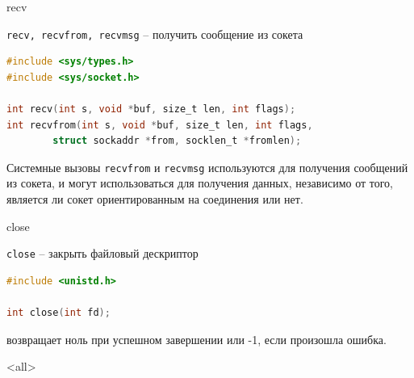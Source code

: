 \begin{frame}[fragile]{recv}

{\tt recv,  recvfrom,  recvmsg} -- получить сообщение из сокета
\begin{lstlisting}[language=C]
#include <sys/types.h>
#include <sys/socket.h>

int recv(int s, void *buf, size_t len, int flags);
int recvfrom(int s, void *buf, size_t len, int flags,
		struct sockaddr *from, socklen_t *fromlen);
\end{lstlisting}
Системные вызовы {\tt recvfrom} и {\tt recvmsg} используются для получения сообщений из  сокета, и  могут
использоваться  для получения данных,  независимо от того,  является ли сокет ориентированным на
соединения или нет.
\end{frame}

\begin{frame}[fragile]{close}

{\tt close} -- закрыть файловый дескриптор
\begin{lstlisting}[language=C]
#include <unistd.h>

int close(int fd);
\end{lstlisting}
возвращает ноль при успешном завершении или -1,  если произошла ошибка.
\end{frame}


\mode<all>{}


